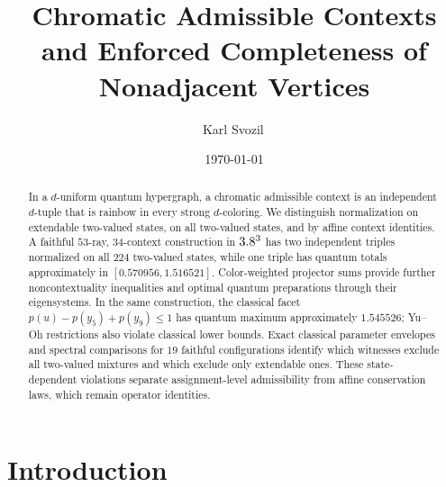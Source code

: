 \documentclass[aps,pra,reprint,superscriptaddress,longbibliography,nofootinbib,floatfix,10pt]{revtex4-2}
\theoremstyle{definition}\newtheorem{definition}[theorem]{Definition}
\theoremstyle{remark}\newtheorem{remark}[theorem]{Remark}
\begin{document}
\title{Chromatic Admissible Contexts and Enforced Completeness of Nonadjacent Vertices}

\author{Karl Svozil\,}

\date{\today}

\begin{abstract}
In a $d$-uniform quantum hypergraph, a chromatic admissible context is an independent $d$-tuple that is rainbow in every strong $d$-coloring. We distinguish normalization on extendable two-valued states, on all two-valued states, and by affine context identities. A faithful $53$-ray, $34$-context construction in $3.8^3$ has two independent triples normalized on all $224$ two-valued states, while one triple has quantum totals approximately in $[0.570956,1.516521]$. Color-weighted projector sums provide further noncontextuality inequalities and optimal quantum preparations through their eigensystems. In the same construction, the classical facet $p(u)-p(y_5)+p(y_9)\le1$ has quantum maximum approximately $1.545526$; Yu--Oh restrictions also violate classical lower bounds. Exact classical parameter envelopes and spectral comparisons for $19$ faithful configurations identify which witnesses exclude all two-valued mixtures and which exclude only extendable ones. These state-dependent violations separate assignment-level admissibility from affine conservation laws, which remain operator identities.
\end{abstract}

\maketitle

\section{Introduction}\label{sec:intro}
\end{document}
